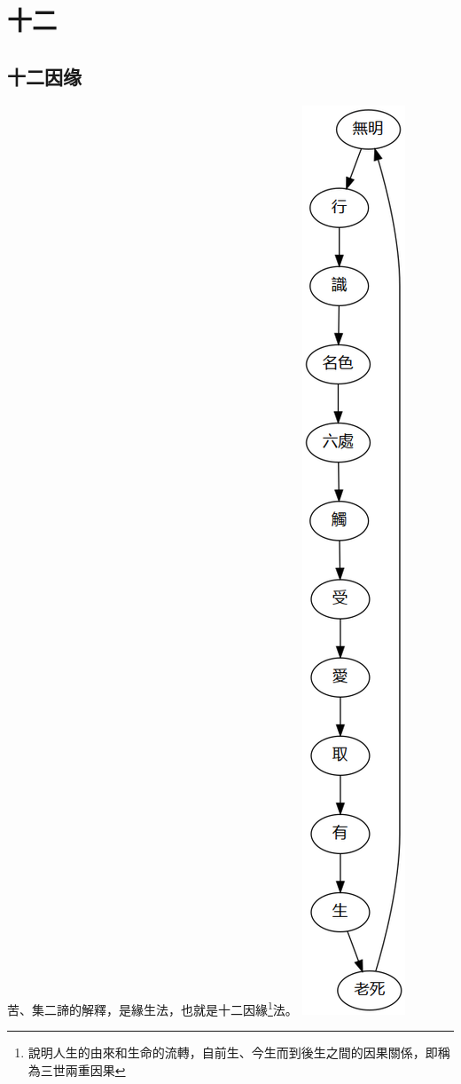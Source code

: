 \section{十二}

\subsection{十二因缘}
苦、集二諦的解釋，是緣生法，也就是十二因緣\footnote{說明人生的由來和生命的流轉，自前生、今生而到後生之間的因果關係，即稱為三世兩重因果}法。
\includegraphics[height=\textheight]{释家/images/十二因缘.png}
